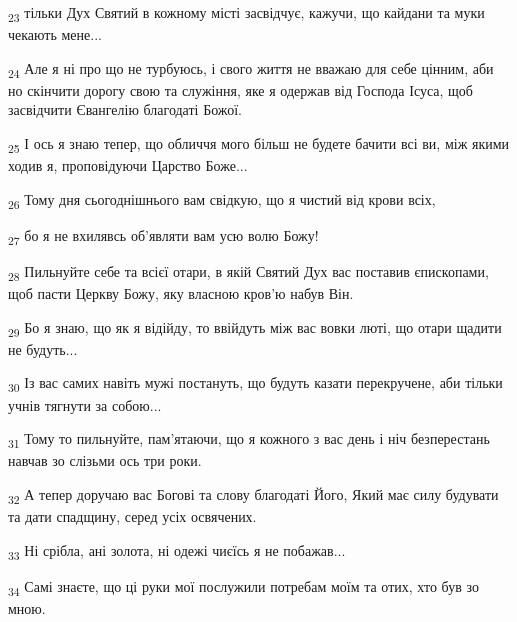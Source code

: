 \begin{tcolorbox}
\textsubscript{23} тільки Дух Святий в кожному місті засвідчує, кажучи, що кайдани та муки чекають мене...
\end{tcolorbox}
\begin{tcolorbox}
\textsubscript{24} Але я ні про що не турбуюсь, і свого життя не вважаю для себе цінним, аби но скінчити дорогу свою та служіння, яке я одержав від Господа Ісуса, щоб засвідчити Євангелію благодаті Божої.
\end{tcolorbox}
\begin{tcolorbox}
\textsubscript{25} І ось я знаю тепер, що обличчя мого більш не будете бачити всі ви, між якими ходив я, проповідуючи Царство Боже...
\end{tcolorbox}
\begin{tcolorbox}
\textsubscript{26} Тому дня сьогоднішнього вам свідкую, що я чистий від крови всіх,
\end{tcolorbox}
\begin{tcolorbox}
\textsubscript{27} бо я не вхилявсь об'являти вам усю волю Божу!
\end{tcolorbox}
\begin{tcolorbox}
\textsubscript{28} Пильнуйте себе та всієї отари, в якій Святий Дух вас поставив єпископами, щоб пасти Церкву Божу, яку власною кров'ю набув Він.
\end{tcolorbox}
\begin{tcolorbox}
\textsubscript{29} Бо я знаю, що як я відійду, то ввійдуть між вас вовки люті, що отари щадити не будуть...
\end{tcolorbox}
\begin{tcolorbox}
\textsubscript{30} Із вас самих навіть мужі постануть, що будуть казати перекручене, аби тільки учнів тягнути за собою...
\end{tcolorbox}
\begin{tcolorbox}
\textsubscript{31} Тому то пильнуйте, пам'ятаючи, що я кожного з вас день і ніч безперестань навчав зо слізьми ось три роки.
\end{tcolorbox}
\begin{tcolorbox}
\textsubscript{32} А тепер доручаю вас Богові та слову благодаті Його, Який має силу будувати та дати спадщину, серед усіх освячених.
\end{tcolorbox}
\begin{tcolorbox}
\textsubscript{33} Ні срібла, ані золота, ні одежі чиєїсь я не побажав...
\end{tcolorbox}
\begin{tcolorbox}
\textsubscript{34} Самі знаєте, що ці руки мої послужили потребам моїм та отих, хто був зо мною.
\end{tcolorbox}
